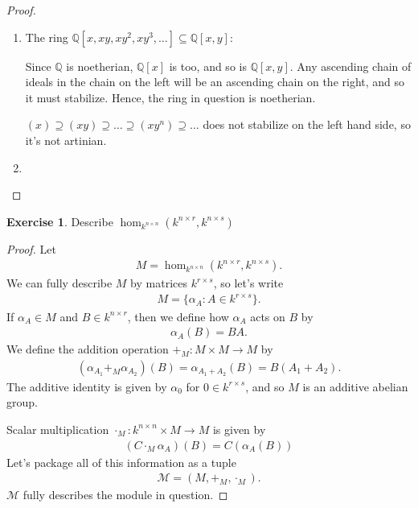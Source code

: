 \documentclass[12pt]{extarticle}
\newcommand{\set}[1]{\{#1\}}
\newcommand{\Q}{\mathbb{Q}}
\newcommand{\<}{\langle}
\renewcommand{\>}{\rangle}
\theoremstyle{definition}
\newtheorem{exercise}{Exercise}
\begin{document}
\begin{proof}
\begin{enumerate}
  \item
    The ring $\Q[x,xy,xy^2,xy^3,\dots] \subseteq \Q[x,y]$:

    Since $\Q$ is noetherian, $\Q[x]$ is too, and so is $\Q[x,y]$. Any ascending chain of ideals in the chain on the left will be an ascending chain on the right, and so it must stabilize. Hence, the ring in question is noetherian.

    $(x) \supseteq (xy) \supseteq \dots \supseteq (xy^n) \supseteq \dots $ does not stabilize on the left hand side, so it's not artinian. 
  \item
  \end{enumerate}
\end{proof}

\begin{exercise}
  Describe $\hom_{k^{n \times n}}(k^{n \times r}, k^{n \times s})$
\end{exercise}
\begin{proof}
  Let 
  \begin{align*}
    M = \hom_{k^{n \times n}}(k^{n \times r}, k^{n \times s}).
  \end{align*}
  We can fully describe $M$ by matrices $k^{r \times s}$, so let's write
  \begin{align*}
    M = \set{\alpha_A : A \in k^{r \times s}}.
  \end{align*}
  If $\alpha_A \in M$ and $B \in k^{n \times r}$, then we define how $\alpha_A$ acts on $B$ by
  \begin{align*}
    \alpha_A(B) = BA.
  \end{align*}
  We define the addition operation $+_M: M \times M \to M$ by 
  \begin{align*}
    (\alpha_{A_1} +_M \alpha_{A_2})(B) = \alpha_{A_1 + A_2}(B) = B(A_1 + A_2).
  \end{align*}
  The additive identity is given by $\alpha_0$ for $0 \in k^{r \times s}$, and so $M$ is an additive abelian group.
  
  Scalar multiplication $\cdot_M: k^{n \times n} \times M \to M$ is given by
  \begin{align*}
    (C \cdot_M \alpha_A) (B) = C(\alpha_A(B))
  \end{align*}
  Let's package all of this information as a tuple
  \begin{align*}
    \mathcal{M} = (M, +_M, \cdot_M).
  \end{align*}
  $\mathcal{M}$ fully describes the module in question. 
\end{proof}
\end{document}
